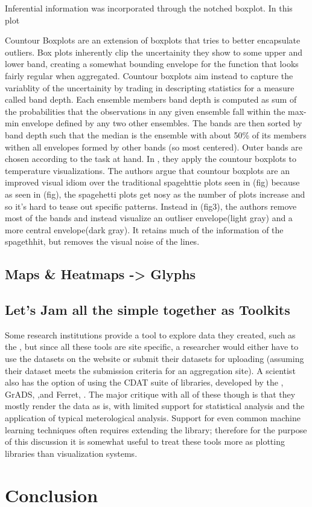 \documentclass[letterpaper,onecolumn,titlepage]{Ythesis}
\begin{document}
Inferential information was incorporated through the notched boxplot. \cite{McGill} %
In this plot










Countour Boxplots \cite{Whitaker2013} are an extension of boxplots that tries to better encapsulate outliers. Box plots inherently clip the uncertainity they show to some upper and lower band, 
creating a somewhat bounding envelope for the function that looks fairly regular when aggregated. Countour boxplots aim instead to capture the variablity of the uncertainity by trading in descripting
statistics for a measure called band depth. Each ensemble members band depth is computed as sum of the probabilities that the observations in any given ensemble fall within the max-min envelope defined by any two other ensembles. The bands are then sorted by band depth such that the median is the ensemble with about 50\% of its members withen all envelopes formed by other bands (so most centered). Outer bands are chosen according to the task at hand. In \cite{Whitaker2013}, they apply the countour boxplots to temperature visualizations. %
The authors argue that countour boxplots are an improved visual idiom over the traditional spagehttie plots seen in (fig) because as seen in (fig), the spagehetti plots get nosy as the number of plots increase and so it's hard to tease out specific patterns. Instead in (fig3), the authors remove most of the bands and instead visualize an outliser envelope(light gray) and a more central envelope(dark gray). It retains much of the information of the spagethhit, but removes the visual noise of the lines.  
\subsection{Maps & Heatmaps -> Glyphs}     


\subsection{Let's Jam all the simple together as Toolkits}
Some research institutions provide a tool to explore data they created, such as the \cite{src:esrlpsd}, but since all these tools are site specific, a researcher would either have to use the datasets on the website or submit their datasets for uploading 
(assuming their dataset meets the submission criteria for an aggregation site). A scientist also has the option of using the CDAT suite of libraries, developed by the \cite{WilliamsEtAl13}, GrADS, \cite{src:grads},and Ferret, \cite{src:HankinEtAl96}. The major critique with all of these though is that they mostly render the data as is, with limited support for statistical analysis and the application of typical meterological analysis. Support for even common machine learning techniques often requires extending the library; therefore for the purpose of this discussion it is somewhat useful to treat these tools more as plotting libraries than visualization systems. %


\section{Conclusion}
\label{sec:conclusion}


\pagebreak


\end{document}
